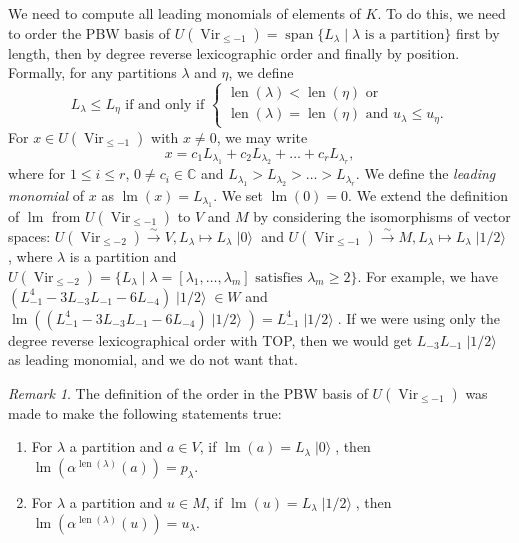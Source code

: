 \documentclass[a4paper, 12pt, reqno]{amsart}
\theoremstyle{remark}
\newtheorem{remark}[theorem]{Remark}
\numberwithin{equation}{subsection}
\DeclareMathOperator{\Vir}{Vir}
\DeclareMathOperator{\lm}{lm}
\DeclareMathOperator{\vspan}{span}
\DeclareMathOperator{\len}{len}
\DeclareMathOperator{\vac}{|0\rangle}
\DeclareMathOperator{\vachalf}{|1/2\rangle}
\begin{document}
We need to compute all leading monomials of elements of $K$.
To do this, we need to order the PBW basis of $U(\Vir_{\le -1}) = \vspan\{L_{\lambda} \mid \lambda\text{ is a partition}\}$ first by length, then by degree reverse lexicographic order and finally by position.
Formally, for any partitions $\lambda$ and $\eta$, we define
\begin{equation*}
  L_{\lambda} \le L_{\eta}\text{ if and only if }
  \begin{cases}
    \len(\lambda) < \len(\eta)\text{ or } \\
    \len(\lambda) = \len(\eta)\text{ and }u_{\lambda} \le u_{\eta}.
  \end{cases}
\end{equation*}
For $x \in U(\Vir_{\le -1})$ with $x \neq 0$, we may write
\begin{equation*}
  x = c_1L_{\lambda_1} + c_2L_{\lambda_2} + \dots + c_rL_{\lambda_r},
\end{equation*}
where for $1 \le i \le r$, $0 \neq c_i \in \mathbb{C}$ and $L_{\lambda_1} > L_{\lambda_2} > \dots > L_{\lambda_r}$.
We define the \emph{leading monomial} of $x$ as $\lm(x) = L_{\lambda_1}$.
We set $\lm(0) = 0$.
We extend the definition of $\lm$ from $U(\Vir_{\le -1})$ to $V$ and $M$ by considering the isomorphisms of vector spaces: $U(\Vir_{\le -2}) \xrightarrow{\sim} V, L_{\lambda} \mapsto L_{\lambda}\vac$ and $U(\Vir_{\le -1}) \xrightarrow{\sim} M, L_{\lambda} \mapsto L_{\lambda}\vachalf$, where $\lambda$ is a partition and $U(\Vir_{\le -2}) = \{L_{\lambda} \mid \lambda = [\lambda_1, \dots, \lambda_m]\text{ satisfies }\lambda_m \ge 2\}$.
For example, we have $(L_{-1}^4 - 3L_{-3}L_{-1} - 6L_{-4})\vachalf \in W$ and $\lm((L_{-1}^4 - 3L_{-3}L_{-1} - 6L_{-4})\vachalf) = L_{-1}^4\vachalf$.
If we were using only the degree reverse lexicographical order with TOP, then we would get $L_{-3}L_{-1}\vachalf$ as leading monomial, and we do not want that.

\begin{remark}
  \label{rmk:43}
  The definition of the order in the PBW basis of $U(\Vir_{\le -1})$ was made to make the following statements true:
  \begin{enumerate}
  \item For $\lambda$ a partition and $a \in V$, if $\lm(a) = L_{\lambda}\vac$, then $\lm(\alpha^{\len(\lambda)}(a)) = p_{\lambda}$.
  \item For $\lambda$ a partition and $u \in M$, if $\lm(u) = L_{\lambda}\vachalf$, then $\lm(\alpha^{\len(\lambda)}(u)) = u_{\lambda}$.
  \end{enumerate}
\end{remark}
\end{document}
